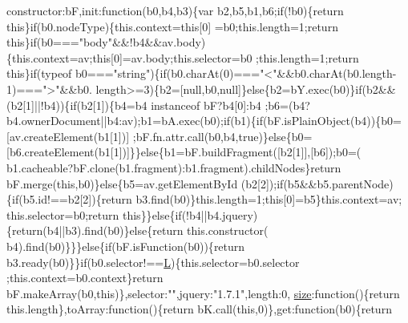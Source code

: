 \begin{DoxyCode}
      constructor:bF,init:\textcolor{keyword}{function}(b0,b4,b3)\{var b2,b5,b1,b6;\textcolor{keywordflow}{if}(!b0)\{\textcolor{keywordflow}{return} \textcolor{keyword}{this}\}\textcolor{keywordflow}{if}(b0.nodeType)\{this.context=\textcolor{keyword}{this}[0]
      =b0;this.length=1;\textcolor{keywordflow}{return} \textcolor{keyword}{this}\}\textcolor{keywordflow}{if}(b0===\textcolor{stringliteral}{"body"}&&!b4&&av.body)\{this.context=av;\textcolor{keyword}{this}[0]=av.body;this.selector=b0
      ;this.length=1;\textcolor{keywordflow}{return} \textcolor{keyword}{this}\}\textcolor{keywordflow}{if}(typeof b0===\textcolor{stringliteral}{"string"})\{\textcolor{keywordflow}{if}(b0.charAt(0)===\textcolor{stringliteral}{"<"}&&b0.charAt(b0.length-1)===\textcolor{stringliteral}{">"}&&b0.
      length>=3)\{b2=[null,b0,null]\}\textcolor{keywordflow}{else}\{b2=bY.exec(b0)\}\textcolor{keywordflow}{if}(b2&&(b2[1]||!b4))\{\textcolor{keywordflow}{if}(b2[1])\{b4=b4 instanceof bF?b4[0]:b4
      ;b6=(b4?b4.ownerDocument||b4:av);b1=bA.exec(b0);\textcolor{keywordflow}{if}(b1)\{\textcolor{keywordflow}{if}(bF.isPlainObject(b4))\{b0=[av.createElement(b1[1])]
      ;bF.fn.attr.call(b0,b4,\textcolor{keyword}{true})\}\textcolor{keywordflow}{else}\{b0=[b6.createElement(b1[1])]\}\}\textcolor{keywordflow}{else}\{b1=bF.buildFragment([b2[1]],[b6]);b0=(
      b1.cacheable?bF.clone(b1.fragment):b1.fragment).childNodes\}\textcolor{keywordflow}{return} bF.merge(\textcolor{keyword}{this},b0)\}\textcolor{keywordflow}{else}\{b5=av.getElementById
      (b2[2]);\textcolor{keywordflow}{if}(b5&&b5.parentNode)\{\textcolor{keywordflow}{if}(b5.id!==b2[2])\{\textcolor{keywordflow}{return} b3.find(b0)\}this.length=1;\textcolor{keyword}{this}[0]=b5\}this.context=av;
      this.selector=b0;\textcolor{keywordflow}{return} \textcolor{keyword}{this}\}\}\textcolor{keywordflow}{else}\{\textcolor{keywordflow}{if}(!b4||b4.jquery)\{\textcolor{keywordflow}{return}(b4||b3).find(b0)\}\textcolor{keywordflow}{else}\{\textcolor{keywordflow}{return} this.constructor(
      b4).find(b0)\}\}\}\textcolor{keywordflow}{else}\{\textcolor{keywordflow}{if}(bF.isFunction(b0))\{\textcolor{keywordflow}{return} b3.ready(b0)\}\}\textcolor{keywordflow}{if}(b0.selector!==\hyperlink{jquery_8js_a38ee4c0b5f4fe2a18d0c783af540d253}{L})\{this.selector=b0.selector
      ;this.context=b0.context\}\textcolor{keywordflow}{return} bF.makeArray(b0,\textcolor{keyword}{this})\},selector:\textcolor{stringliteral}{""},jquery:\textcolor{stringliteral}{"1.7.1"},length:0,
      \hyperlink{all__15_8js_acbd9773931ec61196e11d59d52b43cb3}{size}:\textcolor{keyword}{function}()\{\textcolor{keywordflow}{return} this.length\},toArray:\textcolor{keyword}{function}()\{\textcolor{keywordflow}{return} bK.call(\textcolor{keyword}{this},0)\},\textcolor{keyword}{get}:\textcolor{keyword}{function}(b0)\{\textcolor{keywordflow}{return} 

\end{DoxyCode}
